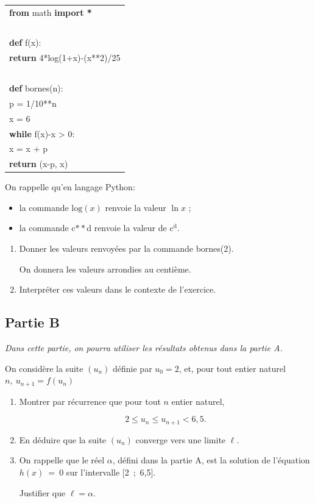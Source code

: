 \documentclass[10pt]{article}
\begin{document}
\begin{enumerate}
\begin{center}
\begin{tabular}{|l|}\hline
\quad \textbf{from} math \textbf{import *}\\
~\\
\quad \textbf{def} f(x):\\
\quad \qquad\textbf{return} 4*log(1+x)-(x**2)/25\\
~\\
\quad \textbf{def} bornes(n):\\
\quad \qquad p = 1/10**n\\
\quad \qquad x = 6\\
\quad \qquad \textbf{while} f(x)-x > 0:\\
\quad \qquad\qquad x = x + p\\
\quad \qquad\textbf{return} (x-p, x)\\\hline
\end{tabular}
\end{center}

On rappelle qu'en langage Python:


\begin{itemize}[label=$\bullet~$]
\item la commande $\text{log} (x)$ renvoie la valeur $\ln x$ ; 
\item la commande c$**$d renvoie la valeur de $\text{c}^{\text{d}}$.
\end{itemize}

	\begin{enumerate}
		\item Donner les valeurs renvoyées par la commande bornes(2).
		
On donnera les valeurs arrondies au centième.
		\item Interpréter ces valeurs dans le contexte de l'exercice.
	\end{enumerate}
\end{enumerate}

\subsection*{Partie B}

\emph{Dans cette partie, on pourra utiliser les résultats obtenus dans la partie A.}

On considère la suite $(u_n)$ définie par $u_0 = 2$, et, pour tout entier naturel $n,\: u_{n+1} = f\left(u_n\right)$

\begin{enumerate}
\item Montrer par récurrence que pour tout $n$ entier naturel,

\[2 \leqslant u_n \leqslant u_{n+1} < 6,5.\]
\item En déduire que la suite $(u_n)$ converge vers une limite $\ell$.
\item On rappelle que le réel $\alpha$, défini dans la partie A, est la solution de l'équation $h(x)~=~0$ sur l'intervalle [2~;~6,5].

Justifier que $\ell = \alpha$.
\end{enumerate}

\bigskip
\end{document}
